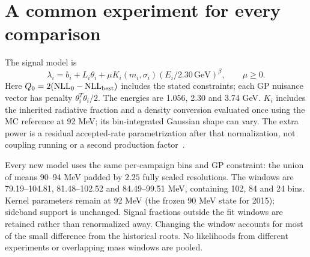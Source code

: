 \documentclass[11pt,letterpaper]{article}
\begin{document}
\section*{A common experiment for every comparison}
The signal model is
\[
 \lambda_i=b_i+L_i\theta_i+\mu K_i(m_i,\sigma_i)
       (E_i/2.30\,\mathrm{GeV})^\beta,\qquad \mu\geq0.
\]
Here $Q_0=2(\mathrm{NLL}_0-\mathrm{NLL}_{\rm best})$ includes the stated constraints; each GP nuisance vector has penalty $\theta_i^T\theta_i/2$.
The energies are 1.056, 2.30 and 3.74 GeV. $K_i$ includes the inherited radiative fraction and a density conversion evaluated once using the MC reference at 92 MeV; its bin-integrated Gaussian shape can vary. The extra power is a residual accepted-rate parametrization after that normalization, not coupling running or a second production factor~\cite{hps,bjorken}.

Every new model uses the same per-campaign bins and GP constraint: the union of means 90--94 MeV padded by $2.25$ fully scaled resolutions. The windows are 79.19--104.81, 81.48--102.52 and 84.49--99.51 MeV, containing 102, 84 and 24 bins. Kernel parameters remain at 92 MeV (the frozen 90 MeV state for 2015); sideband support is unchanged. Signal fractions outside the fit windows are retained rather than renormalized away. Changing the window accounts for most of the small difference from the historical roots. No likelihoods from different experiments or overlapping mass windows are pooled.
\end{document}
